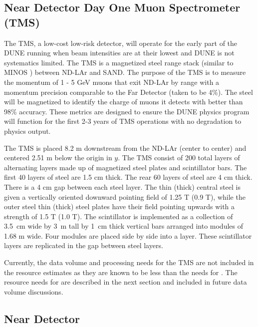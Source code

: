 \documentclass[../main-v1.tex]{subfiles}
\begin{document}

\subsection{Near Detector Day One Muon Spectrometer (TMS) }
\label{sec:comp-dataestimates-mpd}

The TMS, a low-cost low-risk detector, will operate for the early part of the DUNE running when beam intensities are at their lowest and DUNE is not systematics limited. The TMS is a magnetized steel range stack (similar to MINOS \cite{minosNIM}) between ND-LAr and SAND.  The purpose of the TMS is to measure the momentum of 1 - 5 GeV muons that exit ND-LAr by range with a momentum precision comparable to the Far Detector (taken to be 4\%). The steel will be magnetized to identify the charge of muons it detects with better than 98\% accuracy. These metrics are designed to ensure the DUNE physics program will function for the first 2-3 years of TMS operations with no degradation to physics output.

The TMS is placed 8.2 m downstream from the ND-LAr (center to center) and centered 2.51 m below the origin in $y$. The TMS consist of 200 total layers of alternating layers made up of magnetized steel plates and scintillator bars. The first 40 layers of steel are 1.5 cm thick. The rear 60 layers of steel are 4 cm thick. There is a 4 cm gap between each steel layer.  The thin (thick) central steel is given a vertically oriented downward pointing field of 1.25 T (0.9 T), while the outer steel thin (thick) steel plates have their field pointing upwards with a strength of 1.5 T (1.0 T). The scintillator is implemented as a collection of 3.5~cm wide by 3~m tall by 1~cm thick vertical bars arranged into modules of 1.68 m wide. Four modules are placed side by side into a layer. These scintillator layers are replicated in the gap between steel layers.  

Currently, the data volume and processing needs for the TMS are not included in the resource estimates as they are known to be less than the needs for . The resource needs for  are described in the next section and included in future data volume discussions.

\subsection{Near Detector  }
\label{sec:comp-dataestimates-gartpc}
\end{document}
